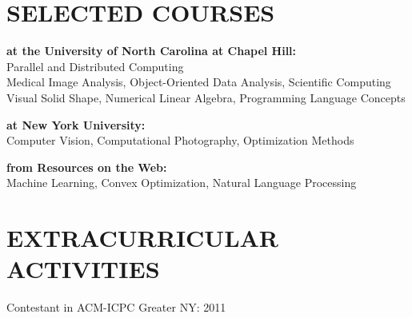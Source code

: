 \documentclass{res}
\begin{document}
\begin{resume}
\section{SELECTED COURSES}
     \vspace{-0.05in}	
    \begin{tabbing}
    {\bf at the University of North Carolina at Chapel Hill:}\\
    Parallel and Distributed Computing\\
    Medical Image Analysis, Object-Oriented Data Analysis, Scientific Computing \\
    Visual Solid Shape, Numerical Linear Algebra, Programming Language Concepts\\
    \end{tabbing}\vspace{-30pt}
         \begin{tabbing}
    {\bf at New York University:}\\
    Computer Vision, Computational Photography, Optimization Methods\\
        \end{tabbing}\vspace{-30pt}
         \begin{tabbing}
    {\bf from Resources on the Web:}\\
    Machine Learning, Convex Optimization, Natural Language Processing
            \end{tabbing}


\section{EXTRACURRICULAR ACTIVITIES}
    \vspace{0.05in}
    Contestant in ACM-ICPC Greater NY: 2011\\

\end{resume}
\end{document}
